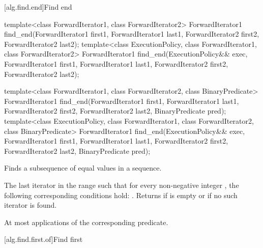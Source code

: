 [alg.find.end]{Find end}

%
\begin{itemdecl}
template<class ForwardIterator1, class ForwardIterator2>
  ForwardIterator1
    find_end(ForwardIterator1 first1, ForwardIterator1 last1,
             ForwardIterator2 first2, ForwardIterator2 last2);
template<class ExecutionPolicy, class ForwardIterator1, class ForwardIterator2>
  ForwardIterator1
    find_end(ExecutionPolicy&& exec,
             ForwardIterator1 first1, ForwardIterator1 last1,
             ForwardIterator2 first2, ForwardIterator2 last2);

template<class ForwardIterator1, class ForwardIterator2,
         class BinaryPredicate>
  ForwardIterator1
    find_end(ForwardIterator1 first1, ForwardIterator1 last1,
             ForwardIterator2 first2, ForwardIterator2 last2,
             BinaryPredicate pred);
template<class ExecutionPolicy, class ForwardIterator1, class ForwardIterator2,
         class BinaryPredicate>
  ForwardIterator1
    find_end(ExecutionPolicy&& exec,
             ForwardIterator1 first1, ForwardIterator1 last1,
             ForwardIterator2 first2, ForwardIterator2 last2,
             BinaryPredicate pred);
\end{itemdecl}

\begin{itemdescr}
\pnum
\effects
Finds a subsequence of equal values in a sequence.

\pnum
\returns
The last iterator
in the range 
such that for every non-negative integer
,
the following corresponding conditions hold:
.
Returns 
if
 is empty or if
no such iterator is found.

\pnum
\complexity
At most
applications of the corresponding predicate.
\end{itemdescr}

[alg.find.first.of]{Find first}

